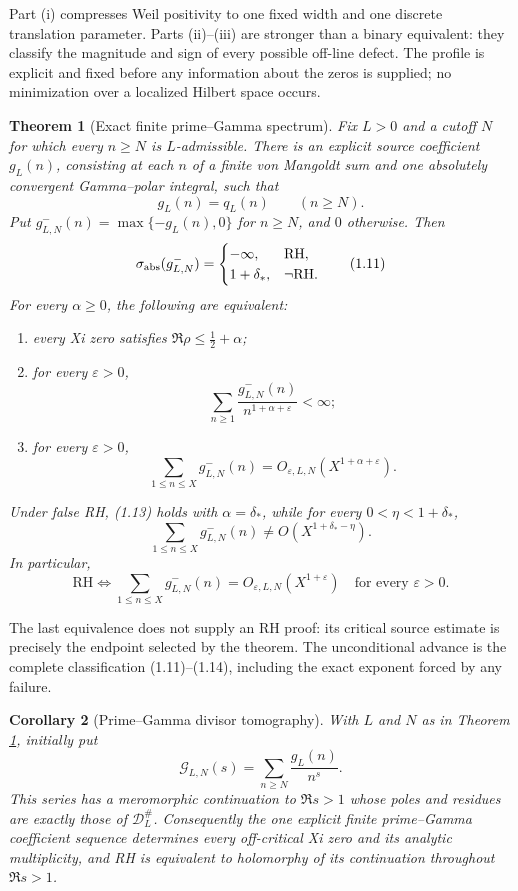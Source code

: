 \documentclass[11pt]{article}
\newtheorem{theorem}{Theorem}[section]
\newtheorem{corollary}[theorem]{Corollary}
\begin{document}
Part (i) compresses Weil positivity to one fixed width and one discrete translation parameter.
Parts (ii)--(iii) are stronger than a binary equivalent: they classify the magnitude and sign of
every possible off-line defect.  The profile is explicit and fixed before any information about
the zeros is supplied; no minimization over a localized Hilbert space occurs.

\begin{theorem}[Exact finite prime--Gamma spectrum]\label{thm:source-main}
Fix \(L>0\) and a cutoff \(N\) for which every \(n\ge N\) is \(L\)-admissible.  There is an
explicit source coefficient \(g_L(n)\), consisting at each \(n\) of a finite von Mangoldt sum and
one absolutely convergent Gamma--polar integral, such that
\[
 g_L(n)=q_L(n)\qquad(n\ge N).
\tag{1.10}
\]
Put \(g^-_{L,N}(n)=\max\{-g_L(n),0\}\) for \(n\ge N\), and \(0\) otherwise.  Then
\[
 \sigma_{\rm abs}(g^-_{L,N})=
 \begin{cases}
  -\infty,&\mathrm{RH},\\
  1+\delta_*,&\neg\mathrm{RH}.
 \end{cases}
\tag{1.11}
\]
For every \(\alpha\ge0\), the following are equivalent:
\begin{enumerate}[label=\textup{(\alph*)}]
\item every Xi zero satisfies \(\Re\rho\le\frac12+\alpha\);
\item for every \(\varepsilon>0\),
\[
 \sum_{n\ge1}\frac{g^-_{L,N}(n)}
 {n^{1+\alpha+\varepsilon}}<\infty;
 \tag{1.12}
\]
\item for every \(\varepsilon>0\),
\[
 \sum_{1\le n\le X}g^-_{L,N}(n)
 =O_{\varepsilon,L,N}(X^{1+\alpha+\varepsilon}).
 \tag{1.13}
\]
\end{enumerate}
Under false RH, (1.13) holds with \(\alpha=\delta_*\), while for every
\(0<\eta<1+\delta_*\),
\[
 \sum_{1\le n\le X}g^-_{L,N}(n)
 \ne O(X^{1+\delta_*-\eta}).
\tag{1.14}
\]
In particular,
\[
 \mathrm{RH}\Longleftrightarrow
 \sum_{1\le n\le X}g^-_{L,N}(n)
 =O_{\varepsilon,L,N}(X^{1+\varepsilon})
 \quad\text{for every }\varepsilon>0.
\tag{1.15}
\]
\end{theorem}

The last equivalence does not supply an RH proof: its critical source estimate is precisely the
endpoint selected by the theorem.  The unconditional advance is the complete classification
(1.11)--(1.14), including the exact exponent forced by any failure.

\begin{corollary}[Prime--Gamma divisor tomography]\label{cor:source-divisor}
With \(L\) and \(N\) as in Theorem \ref{thm:source-main}, initially put
\[
 \mathcal G_{L,N}(s)=\sum_{n\ge N}\frac{g_L(n)}{n^s}.
\]
This series has a meromorphic continuation to \(\Re s>1\) whose poles and residues are exactly
those of \(\mathcal D_L^\#\).  Consequently the one explicit finite prime--Gamma coefficient
sequence determines every off-critical Xi zero and its analytic multiplicity, and RH is
equivalent to holomorphy of its continuation throughout \(\Re s>1\).
\end{corollary}
\end{document}
